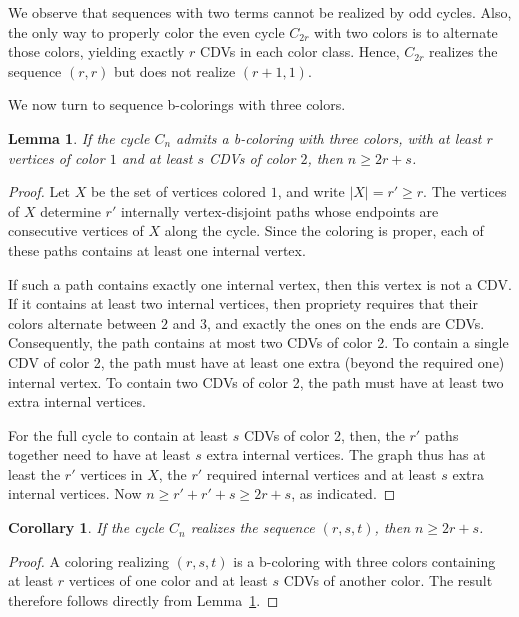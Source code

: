 \documentclass{article}
\newtheorem{corollary}[theorem]{Corollary}
\newtheorem{lemma}[theorem]{Lemma}
\theoremstyle{definition}
\begin{document}
We observe that sequences with two terms cannot be realized by odd cycles.
Also, the only way to properly color the even cycle $C_{2r}$ with two colors is to alternate those colors, yielding exactly $r$ CDVs in each color class.
Hence, $C_{2r}$ realizes the sequence $(r,r)$ but does not realize $(r+1,1)$. 

We now turn to sequence b-colorings with three colors.

\begin{lemma}\label{l:ab,2a+b}
If the cycle $C_n$ admits a b-coloring with three colors, with at least $r$ vertices of color $1$ and at least $s$ CDVs of color $2$, then $n\ge 2r+s$.
\end{lemma}

\begin{proof}
Let $X$ be the set of vertices colored $1$, and write $|X|=r'\ge r$. The vertices of $X$ determine $r'$ internally vertex-disjoint paths whose endpoints are consecutive vertices of $X$ along the cycle. Since the coloring is proper, each of these paths contains at least one internal vertex.

If such a path contains exactly one internal vertex, then this vertex is not a CDV. If it contains at least two internal vertices, then propriety requires that their colors alternate between $2$ and $3$, and exactly the ones on the ends are CDVs. Consequently, the path contains at most two CDVs of color 2.
To contain a single CDV of color 2, the path must have at least one extra (beyond the required one) internal vertex.
To contain two CDVs of color 2, the path must have at least two extra internal vertices.

For the full cycle to contain at least $s$ CDVs of color 2, then, the $r'$ paths together need to have at least $s$ extra internal vertices.
The graph thus has at least the $r'$ vertices in $X$, the $r'$ required internal vertices and at least $s$ extra internal vertices.
Now $n\geq r'+r'+s\geq 2r+s$, as indicated.
\end{proof}

\medskip

\begin{corollary}\label{c:abc,2a+b}
If the cycle $C_n$ realizes the sequence $(r,s,t)$, then $n\geq 2r+s$.
\end{corollary}
\begin{proof}
A coloring realizing $(r,s,t)$ is a b-coloring with three colors containing at least $r$ vertices of one color and at least $s$ CDVs of another color. The result therefore follows directly from Lemma~\ref{l:ab,2a+b}.
\end{proof}
\end{document}
